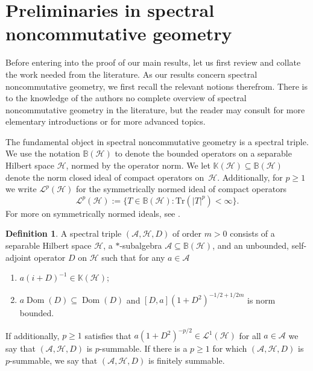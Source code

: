 \documentclass[a4paper,reqno]{amsart}
\numberwithin{equation}{section}
\def\Dom{\operatorname{Dom}}
\theoremstyle{definition}
\newtheorem{definition}[thm]{Definition}
\theoremstyle{remark}
\begin{document}
\section{Preliminaries in spectral noncommutative geometry}
\label{subsecspecncg}


Before entering into the proof of our main results, let us first review and collate the work needed from the literature. As our results concern spectral noncommutative geometry, we first recall the relevant notions therefrom. There is to the knowledge of the authors no complete overview of spectral noncommutative geometry in the literature, but the reader may consult \cite{Blackadar,greenbook,yellowbook} for more elementary introductions or \cite{ConnesETDS,redbook,connesmoscovici,connesreconstr,kaspinv, laffinv,thebeastofmesland} for more advanced topics. 






The fundamental object in spectral noncommutative geometry is a spectral triple. We use the notation $\mathbb{B}(\mathcal{H})$ to denote the bounded operators on a separable Hilbert space $\mathcal{H}$, normed by the operator norm. We let $\mathbb{K}(\mathcal{H})\subseteq \mathbb{B}(\mathcal{H})$ denote the norm closed ideal of compact operators on $\mathcal{H}$. Additionally, for $p\geq 1$ we write $\mathcal{L}^p(\mathcal{H})$ for the symmetrically normed ideal of compact operators 
$$\mathcal{L}^p(\mathcal{H}):=\{T\in \mathbb{B}(\mathcal{H}): \mathrm{Tr}(|T|^p)<\infty\}.$$
For more on symmetrically normed ideals, see \cite{lordzaninsuko,simonbook}. 




\begin{definition}
\label{defspectrip}
A spectral triple $(\mathcal{A},\mathcal{H},D)$ of order $m>0$ consists of a separable Hilbert space $\mathcal{H}$, a $*$-subalgebra $\mathcal{A}\subseteq \mathbb{B}(\mathcal{H})$, and an unbounded, self-adjoint operator $D$ on $\mathcal{H}$ such that for any $a\in \mathcal{A}$
\begin{enumerate}
\item $a(i+D)^{-1}\in \mathbb{K}(\mathcal{H})$;
\item $a\Dom(D)\subseteq \Dom(D)$ and $[D,a](1+D^2)^{-1/2+1/2m}$ is norm bounded.
\end{enumerate}
If additionally, $p\geq 1$ satisfies that $a(1+D^2)^{-p/2}\in \mathcal{L}^1(\mathcal{H})$ for all $a\in \mathcal{A}$ we say that $(\mathcal{A},\mathcal{H},D)$ is $p$-summable. If there is a $p\geq 1$ for which $(\mathcal{A},\mathcal{H},D)$ is $p$-summable, we say that $(\mathcal{A},\mathcal{H},D)$ is finitely summable.
\end{definition}
\end{document}
